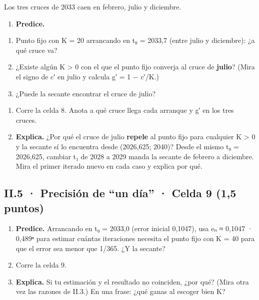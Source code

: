 Los tres cruces de 2033 caen en febrero, julio y diciembre.

\begin{enumerate}
\def\labelenumi{(\alph{enumi})}
\tightlist
\item
  \textbf{Predice.}
\end{enumerate}

\begin{enumerate}
\def\labelenumi{\arabic{enumi}.}
\tightlist
\item
  Punto fijo con K = 20 arrancando en t₀ = 2033,7 (entre julio y diciembre): ¿a qué cruce va?
\item
  ¿Existe algún K \textgreater{} 0 con el que el punto fijo converja al cruce de \textbf{julio}? (Mira el signo de c′ en julio y calcula g′ = 1 − c′/K.)
\item
  ¿Puede la secante encontrar el cruce de julio?
\end{enumerate}

\begin{enumerate}
\def\labelenumi{(\alph{enumi})}
\setcounter{enumi}{1}
\item
  Corre la celda 8. Anota a qué cruce llega cada arranque y g′ en los tres cruces.
\item
  \textbf{Explica.} ¿Por qué el cruce de julio \textbf{repele} al punto fijo para cualquier K \textgreater{} 0 y la secante sí lo encuentra desde (2026,625; 2040)? Desde el mismo t₀ = 2026,625, cambiar t₁ de 2028 a 2029 manda la secante de febrero a diciembre. Mira el primer iterado nuevo en cada caso y explica por qué.
\end{enumerate}

\subsection{II.5 · Precisión de ``un día'' · Celda 9 (1,5 puntos)}

\begin{enumerate}
\def\labelenumi{(\alph{enumi})}
\item
  \textbf{Predice.} Arrancando en t₀ = 2033,0 (error inicial 0,1047), usa eₙ ≈ 0,1047 · 0,489ⁿ para estimar cuántas iteraciones necesita el punto fijo con K = 40 para que el error sea menor que 1/365. ¿Y la secante?
\item
  Corre la celda 9.
\item
  \textbf{Explica.} Si tu estimación y el resultado no coinciden, ¿por qué? (Mira otra vez las razones de II.3.) En una frase: ¿qué ganas al escoger bien K?
\end{enumerate}

